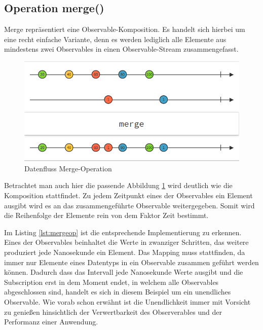 \subsection{Operation merge()}
Merge repräsentiert eine Observable-Komposition. Es handelt sich hierbei um eine recht einfache Variante, denn es werden lediglich alle Elemente aus mindestens zwei Observables in einen Observable-Stream zusammengefasst. 
\begin{figure}
	\centering
	\includegraphics[width=1\textwidth]{Abb/merge}
	\caption{Datenfluss Merge-Operation}
	\label{pic:merge}
\end{figure}
Betrachtet man auch hier die passende Abbildung \ref{pic:merge} wird deutlich wie die Komposition stattfindet. Zu jedem Zeitpunkt eines der Observables ein Element ausgibt wird es an das zusammengeführte Observable weitergegeben. Somit wird die Reihenfolge der Elemente rein von dem Faktor Zeit bestimmt.
 
Im Listing \ref{lst:mergeop} ist die entsprechende Implementierung zu erkennen. Eines der Observables beinhaltet die Werte in zwanziger Schritten, das weitere produziert jede Nanosekunde ein Element. Das Mapping muss stattfinden, da immer nur Elemente eines Datentyps in ein Observable zusammen geführt werden können. Dadurch dass das Intervall jede Nanosekunde Werte ausgibt und die Subscription erst in dem Moment endet, in welchem alle Observables abgeschlossen sind, handelt es sich in diesem Beispiel um ein unendliches Observable. Wie vorab schon erwähnt ist die Unendlichkeit immer mit Vorsicht zu genießen hinsichtlich der Verwertbarkeit des Observerables und der Performanz einer Anwendung.
